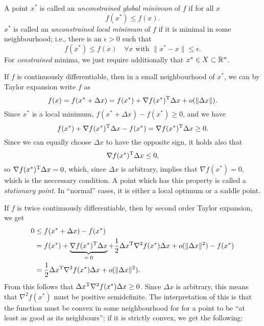 \documentclass{article}
\begin{document}
\label{s:local-global-minima}

A point \(x^*\) is called an \emph{unconstrained global minimum} of \(f\) if for all \(x\)
\begin{equation*}
  f(x^*) \leq f(x).
\end{equation*}
\(x^*\) is called an \emph{unconstrained local minimum} of \(f\) if it is minimal in some
neighbourhood; i.e., there is an \(\epsilon > 0\) such that
\begin{equation*}
  f(x^*) \leq f(x) \quad \forall x \text{ with } \lVert x^* - x \rVert \leq \epsilon.
\end{equation*}
For \emph{constrained} minima, we just require additionally that \(x^* \in X \subset \mathbb{R}^n\).


\label{s:first-order-optimality}

If \(f\) is continuously differentiable, then in a small neighbourhood of \(x^*\), we can by Taylor
expansion write \(f\) as
\begin{equation*}
  f(x) = f(x^* + \Delta x) = f(x^*) + \nabla f(x^*)^{\mathrm{T}} \Delta x + o(\lVert \Delta x \rVert).
\end{equation*}
Since \(x^*\) is a local minimum, \(f(x^* + \Delta x) - f(x^*) \geq 0\), and we have
\begin{equation*}
  f(x^*) + \nabla f(x^*)^{\mathrm{T}} \Delta x - f(x^*) = \nabla f(x^*)^{\mathrm{T}} \Delta x \geq 0.
\end{equation*}
Since we can equally choose \(\Delta x\) to have the opposite sign, it holds also that
\begin{equation*}
  \nabla f(x^*)^{\mathrm{T}} \Delta x \leq 0,
\end{equation*}
so \(\nabla f(x^*)^{\mathrm{T}} \Delta x = 0\), which, since \(\Delta x\) is arbitrary, implies that
\(\nabla f(x^*) = 0\), which is the neccessary condition. A point which has this property is called
a \emph{stationary point}.  In ``normal'' cases, it is either a local optimum or a saddle point.


\label{s:second-order-optimality}

If \(f\) is twice continuously differentiable, then by second order Taylor expansion, we get
\begin{align*}
  0 &\leq f(x^* + \Delta x) - f(x^*) \\
    &= f(x^*) + \underbrace{\nabla f(x^*)^{\mathrm{T}} \Delta x}_{=\; 0} +
      \frac{1}{2} \Delta x^{\mathrm{T}} \nabla^2 f(x^*) \Delta x + o(\lVert \Delta x \rVert^2) - f(x^*) \\
    &=  \frac{1}{2} \Delta x^{\mathrm{T}} \nabla^2 f(x^*) \Delta x + o(\lVert \Delta x \rVert^2).
\end{align*}
From this follows that \(\Delta x^{\mathrm{T}} \nabla^2 f(x^*) \Delta x \geq 0\).  Since \(\Delta x\) is
arbitrary, this means that \(\nabla^2 f(x^*)\) must be positive semidefinite.  The interpretation of
this is that the function must be convex in some neighbourhood for for a point to be ``at least as
good as its neighbours''; if it is strictly convex, we get the following:
\end{document}
